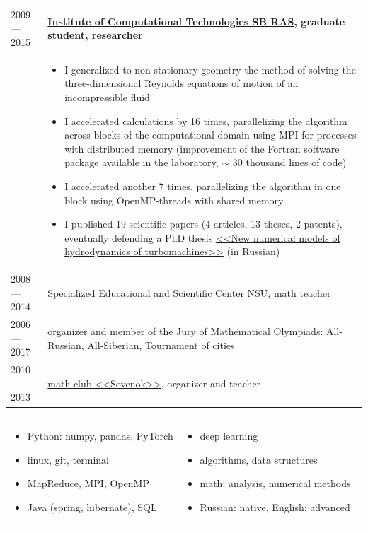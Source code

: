 \documentclass[11pt]{article}
\begin{document}
\begin{longtable} {l | p{}}
2009 — 2015 & {\textbf{\href{http://www.ict.nsc.ru/en}{Institute of Computational Technologies SB RAS}, graduate student, researcher}}\\
& \vspace{-1.5em} \begin{itemize}
	\item I generalized to non-stationary geometry the method of solving the three-dimensional Reynolds equations of motion of an incompressible fluid
	\item I accelerated calculations by 16 times, parallelizing the algorithm across blocks of the computational domain using MPI for processes with distributed memory (improvement of the Fortran software package available in the laboratory, $\sim$ 30 thousand lines of code)
	\item I accelerated another 7 times, parallelizing the algorithm in one block using OpenMP-threads with shared memory
	\item I published 19 scientific papers (4 articles, 13 theses, 2 patents), eventually defending a PhD thesis \href{https://github.com/avalur/dissertation/blob/master/to_print/autoref_Avdyushenko.pdf}{<<New numerical models of hydrodynamics of turbomachines>>} (in Russian)
\end{itemize}
\\

2008 — 2014 & {\href{http://sesc.nsu.ru}{Specialized Educational and Scientific Center NSU}, math teacher}\\
2006 — 2017 & {organizer and member of the Jury of Mathematical Olympiads: All-Russian, All-Siberian, Tournament of cities}\\
2010 — 2013 & {\href{https://www.sovenok.academy/}{math club <<Sovenok>>}, organizer and teacher}\\
\end{longtable}

\newpage
{}
\begin{longtable} {p{}p{}}
\vspace{-2em}
\begin{itemize}
	\item Python: numpy, pandas, PyTorch
	\item linux, git, terminal
	\item MapReduce, MPI, OpenMP
	\item Java (spring, hibernate), SQL
\end{itemize}
&
\vspace{-2em}
\begin{itemize}
	\item deep learning
	\item algorithms, data structures
	\item math: analysis, numerical methods
	\item Russian: native, English: advanced
\end{itemize}
\end{longtable}
\end{document}
